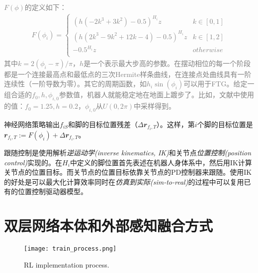 \begin{note}
\noindent\textcolor{gray}{\small
$F(\phi)$的定义如下：
\begin{align}
    F(\phi_i)=\begin{cases}
        (h(-2k^3+3k^2)-0.5)^{H_i}z &k\in[0,1]\\
        (h(2k^3-9k^2+12k-4)-0.5)^{H_i}z &k\in[1,2]\\
        -0.5^{H_i}z & otherwise\\
    \end{cases}
\end{align}
其中$k=2(\phi_i-\pi)/\pi$，$h$是一个表示最大步高的参数。在摆动相位的每一个阶段都是一个连接最高点和最低点的三次Hermite样条曲线，在连接点处曲线具有一阶连续性（一阶导数为零）。其它的周期函数，如$h_i \sin (\phi_i)$可以用于FTG。给定一组合适的$f_0,h,\phi_{i,0}$参数值，机器人就能稳定地在地面上踱步了。比如，文献\cite[p7]{Lee_Hwangbo_Wellhausen_Koltun_Hutter_2020}中使用的值：$f_0=1.25,h=0.2$，$\phi_{i,0}$从$U(0,2\pi)$中采样得到。}
\end{note}

神经网络策略输出$f_{iS}$和脚的目标位置残差（$\Delta \mathbfit{r}_{f_i, T}$）。这样，第$i$个脚的目标位置是$\mathbfit{r}_{f_i, T}:=F(\phi_i)+\Delta \mathbfit{r}_{f_i, T}$。

跟随控制是使用解析\emph{逆运动学(inverse kinematics, IK)}和关节点\emph{位置控制(position control)}实现的。在$H_i$中定义的脚位置首先表述在机器人身体系中，然后用IK计算关节点的位置目标。而关节点的位置目标依靠关节点的PD控制器来跟随。使用IK的好处是可以最大化计算效率同时在\emph{仿真到实际(sim-to-real)}的过程中可以复用已有的位置控制驱动器模型\cite[p]{Lee_Hwangbo_Hutter_2019,Hwangbo_Bellicoso_Fankhauser_Huttery_2016}。

\section[双层网络本体和外部感知融合方式]{双层网络本体和外部感知融合方式\cite[p7]{Miki_Lee_Hwangbo_Wellhausen_Koltun_Hutter_2022}}


\begin{figure}
    \centering
    \texttt{[image: train\_process.png]}
    \caption{RL implementation process\cite[p9]{Miki_Lee_Hwangbo_Wellhausen_Koltun_Hutter_2022}.}
    \label{fig:process}
  \end{figure}
  
  
